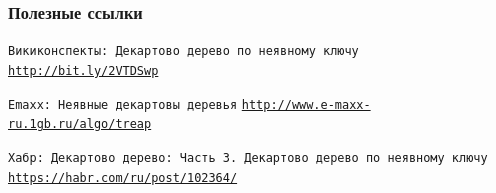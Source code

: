 \documentclass[10pt]{beamer}
\begin{document}
\appendix

\begin{frame}[allowframebreaks]
  \frametitle<presentation>{Полезные ссылки}
    
  \begin{thebibliography}{10}
{
  \beamertemplatebookbibitems

  \texttt{Викиконспекты: Декартово дерево по неявному ключу}
  \newblock \href{http://bit.ly/2VTDSwp}
  {\texttt{http://bit.ly/2VTDSwp}}
  
  \texttt{Emaxx: Неявные декартовы деревья}
  \newblock \href{http://www.e-maxx-ru.1gb.ru/algo/treap}
  {\texttt{http://www.e-maxx-ru.1gb.ru/algo/treap}}
  
  \texttt{Хабр: Декартово дерево: Часть 3. Декартово дерево по неявному ключу}
  \newblock \href{https://habr.com/ru/post/102364/}
  {\texttt{https://habr.com/ru/post/102364/}}
}
  \end{thebibliography}
  \end{frame}
\end{document}
